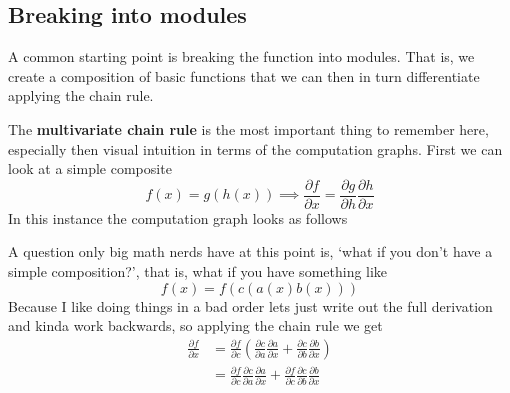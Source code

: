 \documentclass[12pt]{article}
\begin{document}
\subsection{Breaking into modules}

A common starting point is breaking the function into modules. That is, we create a composition of basic functions that we can then in turn differentiate applying the chain rule.

\smallskip
The \textbf{multivariate chain rule} is the most important thing to remember here, especially then visual intuition in terms of the computation graphs. First we can look at a simple composite 
\[
    f(x) = g(h(x))\implies \frac{\partial f}{\partial x} = \frac{\partial g}{\partial h}\frac{\partial h}{\partial x}     
\]
In this instance the computation graph looks as follows
\begin{figure}[!h]
    \centering

\end{figure}

A question only big math nerds have at this point is, `what if you don't have a simple composition?', that is, what if you have something like 
\[
    f(x) = f(c(a(x)b(x)))   
\]
Because I like doing things in a bad order lets just write out the full derivation and kinda work backwards, so applying the chain rule we get 
\begin{align*}
    \frac{\partial f}{\partial x} &= \frac{\partial f}{\partial c}\left( \frac{\partial c}{\partial a} \frac{\partial a}{\partial x} + \frac{\partial c}{\partial b}\frac{\partial b}{\partial x} \right) \\ 
    &= \frac{\partial f}{\partial c}\frac{\partial c}{\partial a}\frac{\partial a}{\partial x} + \frac{\partial f}{\partial c}\frac{\partial c}{\partial b}\frac{\partial b}{\partial x}
\end{align*}
\end{document}
